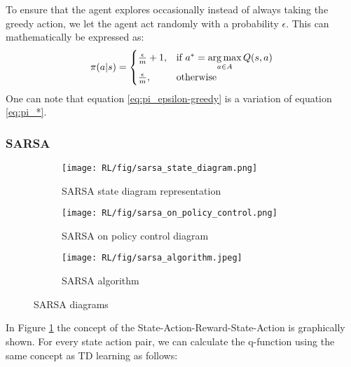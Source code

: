 To ensure that the agent explores occasionally instead of always taking the greedy action, we let the agent act randomly with a probability $\epsilon$. This can mathematically be expressed as:
\begin{align}
	\pi(a|s)=\begin{cases}
		\frac{\epsilon}{m}+1, & \text{if $a^* = \operatorname*{arg\,max}\limits_{a \in A}Q (s,a)$}\\
		\frac{\epsilon}{m}, & \text{otherwise}
	\end{cases}
	\label{eq:pi_epsilon-greedy}
\end{align}
One can note that equation \ref{eq:pi_epsilon-greedy} is a variation of equation \ref{eq:pi_*}.

\subsubsection{SARSA}
\begin{figure}[!htb]
	\begin{subfigure}{.5\textwidth}
		\centering
		\texttt{[image: RL/fig/sarsa\_state\_diagram.png]}
		\caption{SARSA state diagram representation\cite{David_Silver}}
		\label{fig:sarsa_state_diagram}
	\end{subfigure}
	\begin{subfigure}{.49\textwidth}
		\centering
		\texttt{[image: RL/fig/sarsa\_on\_policy\_control.png]}
		\caption{SARSA on policy control diagram\cite{David_Silver}}
		\label{fig:sarsa_on_policy}
	\end{subfigure}
	\begin{subfigure}{1\textwidth}
		\centering
		\texttt{[image: RL/fig/sarsa\_algorithm.jpeg]}
		\caption{SARSA algorithm\cite{David_Silver}}
		\label{fig:sarsa_algorithm}
	\end{subfigure}
	\caption{SARSA diagrams \cite{David_Silver}}
	\label{fig:sarsa}	
\end{figure}
In Figure \ref{fig:sarsa_state_diagram} the concept of the State-Action-Reward-State-Action is graphically shown. For every state action pair, we can calculate the q-function using the same concept as TD learning as follows:

